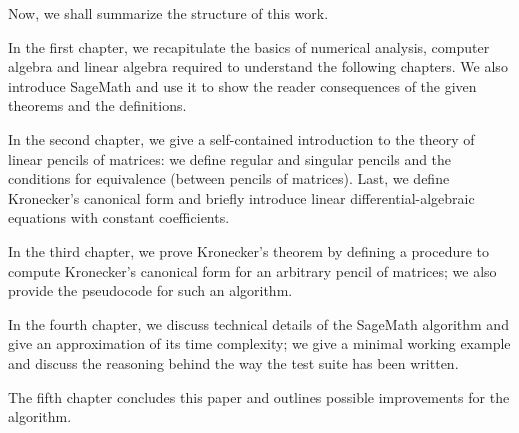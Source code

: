 \vspace{5mm}

Now, we shall summarize the structure of this work.

In the first chapter, we recapitulate the basics of numerical analysis, computer algebra and linear algebra required to
understand the following chapters. We also introduce SageMath and use it to show the reader consequences of the given
theorems and the definitions.

In the second chapter, we give a self-contained introduction to the theory of linear pencils of matrices: we
define regular and singular pencils and the conditions for equivalence (between pencils of matrices). Last, we
define Kronecker's canonical form and briefly introduce linear differential-algebraic equations with constant
coefficients.

In the third chapter, we prove Kronecker's theorem by defining a procedure to compute Kronecker's canonical form
for an arbitrary pencil of matrices; we also provide the pseudocode for such an algorithm.

In the fourth chapter, we discuss technical details of the SageMath algorithm and
give an approximation of its time complexity; we give a minimal working example and discuss the reasoning behind the way
the test suite has been written.

The fifth chapter concludes this paper and outlines possible improvements for the algorithm.